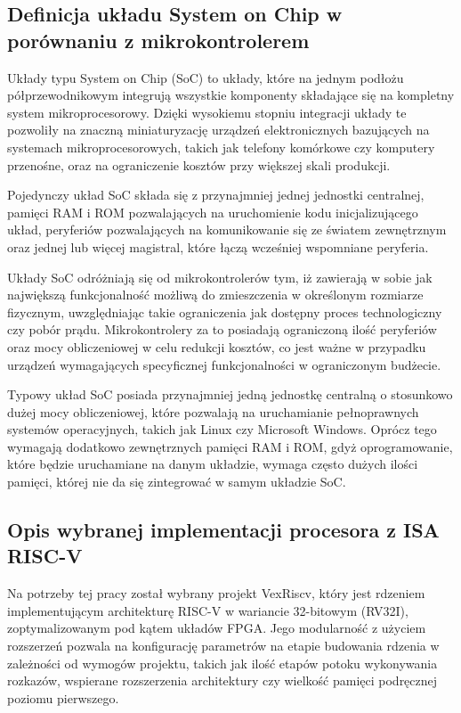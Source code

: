 
\subsection{Definicja układu System on Chip w porównaniu z mikrokontrolerem}

Układy typu System on Chip (SoC) to układy, które na jednym podłożu półprzewodnikowym integrują wszystkie komponenty składające się na kompletny system mikroprocesorowy. Dzięki wysokiemu stopniu integracji układy te pozwoliły na znaczną miniaturyzację urządzeń elektronicznych bazujących na systemach mikroprocesorowych, takich jak telefony komórkowe czy komputery przenośne, oraz na ograniczenie kosztów przy większej skali produkcji.

Pojedynczy układ SoC składa się z przynajmniej jednej jednostki centralnej, pamięci RAM i ROM pozwalających na uruchomienie kodu inicjalizującego układ, peryferiów pozwalających na komunikowanie się ze światem zewnętrznym oraz jednej lub więcej magistral, które łączą wcześniej wspomniane peryferia.

Układy SoC odróżniają się od mikrokontrolerów tym, iż zawierają w sobie jak największą funkcjonalność możliwą do zmieszczenia w określonym rozmiarze fizycznym, uwzględniając takie ograniczenia jak dostępny proces technologiczny czy pobór prądu. Mikrokontrolery za to posiadają ograniczoną ilość peryferiów oraz mocy obliczeniowej w celu redukcji kosztów, co jest ważne w przypadku urządzeń wymagających specyficznej funkcjonalności w ograniczonym budżecie.

Typowy układ SoC posiada przynajmniej jedną jednostkę centralną o stosunkowo dużej mocy obliczeniowej, które pozwalają na uruchamianie pełnoprawnych systemów operacyjnych, takich jak Linux czy Microsoft Windows. Oprócz tego wymagają dodatkowo zewnętrznych pamięci RAM i ROM, gdyż oprogramowanie, które będzie uruchamiane na danym układzie, wymaga często dużych ilości pamięci, której nie da się zintegrować w samym układzie SoC.


\subsection{Opis wybranej implementacji procesora z ISA RISC-V}

Na potrzeby tej pracy został wybrany projekt VexRiscv\cite{vexriscv:2018:Online}, który jest rdzeniem implementującym architekturę RISC-V\cite{Waterman:EECS-2014-54} w wariancie 32-bitowym (RV32I), zoptymalizowanym pod kątem układów FPGA. Jego modularność z użyciem rozszerzeń pozwala na konfigurację parametrów na etapie budowania rdzenia w zależności od wymogów projektu, takich jak ilość etapów potoku wykonywania rozkazów, wspierane rozszerzenia architektury czy wielkość pamięci podręcznej poziomu pierwszego.

